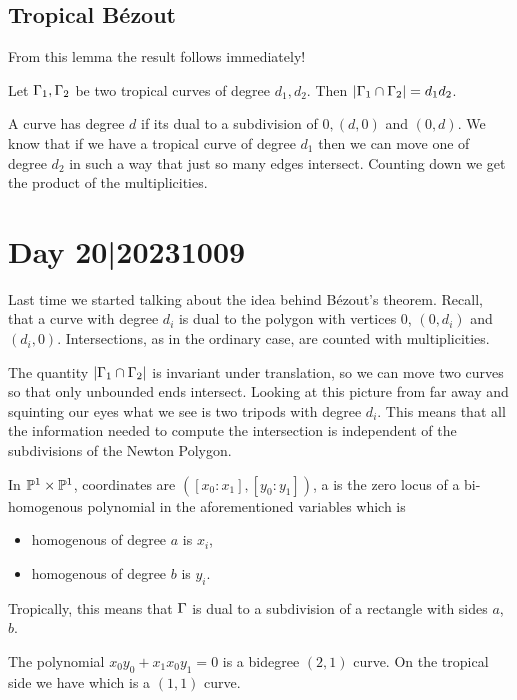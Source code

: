 \documentclass[12pt]{memoir}
\theoremstyle{definition}
\begin{document}
\subsection{Tropical Bézout}

From this lemma the result follows immediately!

\begin{Th}
Let $\Gamma_1,\Gamma_2$ be two tropical curves of degree $d_1,d_2$. Then $|\Gamma_1\cap\Gamma_2|=d_1d_2$.
\end{Th}

A curve has degree $d$ if its dual to a subdivision of $0,(d,0)$ and $(0,d)$. We know that if we have a tropical curve of degree $d_1$ then we can move one of degree $d_2$ in such a way that just so many edges intersect. Counting down we get the product of the multiplicities.

\section{Day 20|20231009}

Last time we started talking about the idea behind Bézout's theorem. Recall, that a curve with degree $d_i$ is dual to the polygon with vertices $0$, $(0,d_i)$ and $(d_i,0)$. Intersections, as in the ordinary case, are counted with multiplicities.\par 
The quantity $|\Gamma_1\cap \Gamma_2|$ is invariant under translation, so we can move two curves so that only unbounded ends intersect. Looking at this picture from far away and squinting our eyes what we see is two tripods with degree $d_i$. This means that all the information needed to compute the intersection is independent of the subdivisions of the Newton Polygon.
\begin{Def}
    In $\mathbb{P}^1\times\mathbb{P}^1$, coordinates are $([x_0:x_1],[y_0:y_1])$, a  is the zero locus of a bi-homogenous polynomial in the aforementioned variables which is 
    \begin{itemize}
        \item homogenous of degree $a$ is $x_i$,
        \item homogenous of degree $b$ is $y_i$.
    \end{itemize}    
    Tropically, this means that $\Gamma$ is dual to a subdivision of a rectangle with sides $a$, $b$.
\end{Def}

\begin{Ex}
    The polynomial $x_0y_0+x_1x_0y_1=0$ is a bidegree $(2,1)$ curve. On the tropical side we have  which is a $(1,1)$ curve.
\end{Ex}
\end{document}
